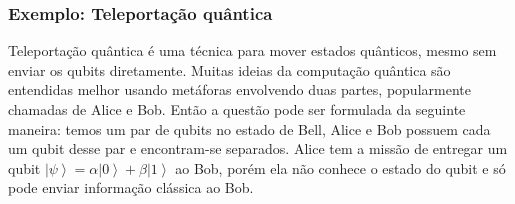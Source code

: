 \subsubsection{Exemplo: Teleportação quântica}

Teleportação quântica é uma técnica para mover estados quânticos, mesmo sem  enviar os qubits diretamente. Muitas ideias da computação quântica são entendidas melhor usando metáforas envolvendo duas partes, popularmente chamadas de Alice e Bob. Então a questão pode ser formulada da seguinte maneira: temos um par de qubits no estado de Bell, Alice e Bob possuem cada um qubit desse par e encontram-se separados. Alice tem a missão de entregar um qubit $\left|\psi\right\rangle =\alpha\left|0\right\rangle +\beta\left|1\right\rangle $ ao Bob, porém ela não conhece o estado do qubit e só pode enviar informação clássica ao Bob.

